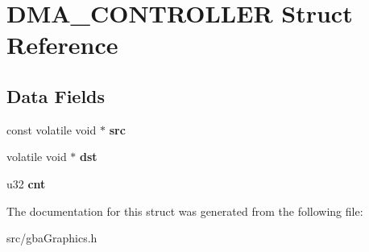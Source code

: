 \hypertarget{struct_d_m_a___c_o_n_t_r_o_l_l_e_r}{}\section{D\+M\+A\+\_\+\+C\+O\+N\+T\+R\+O\+L\+L\+ER Struct Reference}
\label{struct_d_m_a___c_o_n_t_r_o_l_l_e_r}
\subsection*{Data Fields}
\begin{DoxyCompactItemize}
\item 
const volatile void $\ast$ {\bfseries src}\hypertarget{struct_d_m_a___c_o_n_t_r_o_l_l_e_r_a8635df590f3be8660baf434e9dd089c0}{}\label{struct_d_m_a___c_o_n_t_r_o_l_l_e_r_a8635df590f3be8660baf434e9dd089c0}

\item 
volatile void $\ast$ {\bfseries dst}\hypertarget{struct_d_m_a___c_o_n_t_r_o_l_l_e_r_a10bb8d4aba0026759369b4cf877f2d84}{}\label{struct_d_m_a___c_o_n_t_r_o_l_l_e_r_a10bb8d4aba0026759369b4cf877f2d84}

\item 
u32 {\bfseries cnt}\hypertarget{struct_d_m_a___c_o_n_t_r_o_l_l_e_r_a7a0474bcceca8aec71d5fdc392a2c11d}{}\label{struct_d_m_a___c_o_n_t_r_o_l_l_e_r_a7a0474bcceca8aec71d5fdc392a2c11d}

\end{DoxyCompactItemize}


The documentation for this struct was generated from the following file\+:\begin{DoxyCompactItemize}
\item 
src/gba\+Graphics.\+h\end{DoxyCompactItemize}

